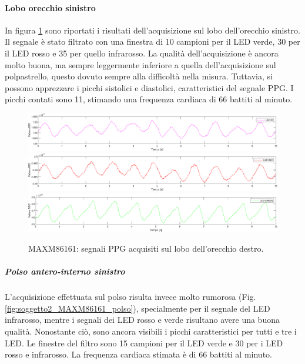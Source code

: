 \paragraph{Lobo orecchio sinistro}
In figura \ref{fig:soggetto2_MAXM86161_lobo} sono riportati i risultati dell'acquisizione sul lobo dell'orecchio sinistro. Il segnale è stato filtrato con una finestra di 10 campioni per il LED verde, 30 per il LED rosso e 35 per quello infrarosso. La qualità dell'acquisizione è ancora molto buona, ma sempre leggermente inferiore a quella dell'acquisizione sul polpastrello, questo dovuto sempre alla difficoltà nella misura. Tuttavia, si possono apprezzare i picchi sistolici e diastolici, caratteristici del segnale PPG. I picchi contati sono 11, stimando una frequenza cardiaca di 66 battiti al minuto.
\begin{figure}[h]
	\centering
	\includegraphics[width=1\linewidth]{ImageFiles/Misure Preliminari/Soggetto 2/maxm86161/lobo_ir_moving_avg}
	\includegraphics[width=1\linewidth]{ImageFiles/Misure Preliminari/Soggetto 2/maxm86161/lobo_red_moving_avg}
	\includegraphics[width=1\linewidth]{ImageFiles/Misure Preliminari/Soggetto 2/maxm86161/lobo_green_moving_avg}
	\caption{MAXM86161: segnali PPG acquisiti sul lobo dell'orecchio destro.}
	\label{fig:soggetto2_MAXM86161_lobo}
\end{figure}

\clearpage

\subparagraph{Polso antero-interno sinistro}
L'acquisizione effettuata sul polso risulta invece molto rumorosa (Fig. \ref{fig:soggetto2_MAXM86161_polso}), specialmente per il segnale del LED infrarosso, mentre i segnali dei LED rosso e verde risultano avere una buona qualità. Nonostante ciò, sono ancora visibili i picchi caratteristici per tutti e tre i LED. Le finestre del filtro sono 15 campioni per il LED verde e 30 per i LED rosso e infrarosso. La frequenza cardiaca stimata è di 66 battiti al minuto.

